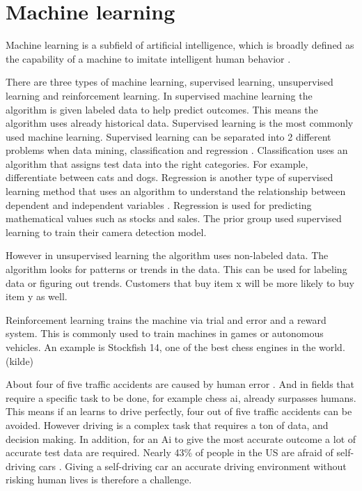 \section{Machine learning}
Machine learning is a subfield of artificial intelligence, which is broadly defined as the capability of a machine to imitate intelligent human behavior \parencite{ml_explained}.

There are three types of machine learning, supervised learning, unsupervised learning and reinforcement learning. In supervised machine learning the algorithm is given labeled data to help predict outcomes. This means the algorithm uses already historical data. Supervised learning is the most commonly used machine learning. Supervised learning can be separated into 2 different problems when data mining, classification and regression \parencite{delua_ibm}. Classification uses an algorithm that assigns test data into the right categories. For example, differentiate between cats and dogs. Regression is another type of supervised learning method that uses an algorithm to understand the relationship between dependent and independent variables \parencite{delua_ibm}. Regression is used for predicting mathematical values such as stocks and sales. The prior group used supervised learning to train their camera detection model. 

However in unsupervised learning the algorithm uses non-labeled data. The algorithm looks for patterns or trends in the data. This can be used for labeling data or figuring out trends. Customers that buy item x will be more likely to buy item y as well.

Reinforcement learning trains the machine via trial and error and a reward system. This is commonly used to train machines in games or autonomous vehicles. An example is Stockfish 14, one of the best chess engines in the world. (kilde)


About four of five traffic accidents are caused by human error \parencite{policy_advise}. And in fields that require a specific task to be done, for example chess ai, already surpasses humans. This means if an learns to drive perfectly, four out of five traffic accidents can be avoided. However driving is a complex task that requires a ton of data, and decision making. In addition, for an Ai to give the most accurate outcome a lot of accurate test data are required. Nearly 43\% of people in the US are afraid of self-driving cars \parencite{kopestinsky}. Giving a self-driving car an accurate driving environment without risking human lives is therefore a challenge.